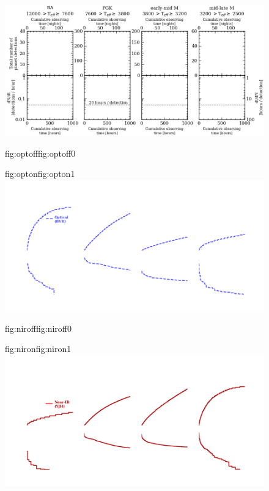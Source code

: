\begin{figure}
  \centering
  \includegraphics[width=\hsize]{figures/cumulativetobsGP_Teff_bkgd.png}%
  \hspace{-\hsize}%
  \begin{ocg}{fig:optoff}{fig:optoff}{0}%
  \end{ocg}%
  \begin{ocg}{fig:opton}{fig:opton}{1}%
  \includegraphics[width=\hsize]{figures/cumulativetobsGP_Teff_opt.png}%
  \end{ocg}
  \hspace{-\hsize}%
  \begin{ocg}{fig:niroff}{fig:niroff}{0}%
  \end{ocg}%
  \begin{ocg}{fig:niron}{fig:niron}{1}%
  \includegraphics[width=\hsize]{figures/cumulativetobsGP_Teff_nir.png}%

\end{ocg}
\end{figure}
